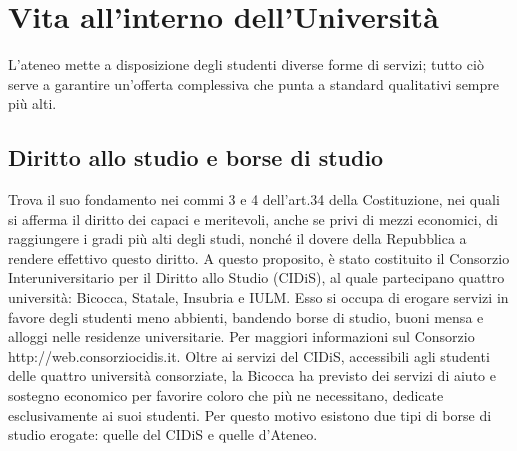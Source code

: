 \section{Vita all'interno dell'Università}
L'ateneo mette a disposizione degli studenti diverse forme di servizi; tutto ciò serve a garantire un'offerta complessiva che punta a standard qualitativi sempre più alti. 

\subsection{Diritto allo studio e borse di studio}
Trova il suo fondamento nei commi 3 e 4 dell'art.34 della Costituzione, nei quali si afferma il diritto dei capaci e meritevoli, anche se privi di mezzi economici, di raggiungere i gradi più alti degli studi, nonché il dovere della Repubblica a rendere effettivo questo diritto. 
A questo proposito, è stato costituito il Consorzio Interuniversitario per il Diritto allo Studio (CIDiS), al quale partecipano quattro università: Bicocca, Statale, Insubria e IULM.  Esso si occupa di erogare servizi in favore degli studenti meno abbienti, bandendo borse di studio, buoni mensa e alloggi nelle residenze universitarie. Per maggiori informazioni sul Consorzio http://web.consorziocidis.it. 
Oltre ai servizi del CIDiS, accessibili agli studenti delle quattro università consorziate, la Bicocca ha previsto dei servizi di aiuto e sostegno economico per favorire coloro che più ne necessitano, dedicate esclusivamente ai suoi studenti. Per questo motivo esistono due tipi di borse di studio erogate: quelle del CIDiS e quelle d'Ateneo. 

